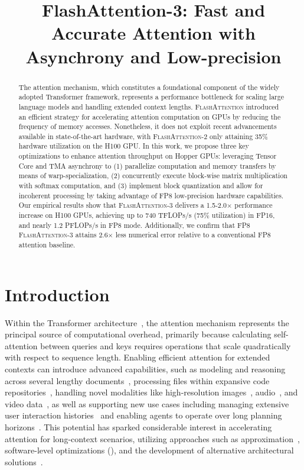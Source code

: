 \title{FlashAttention-3: Fast and Accurate Attention with Asynchrony and Low-precision}

\begin{abstract}
The attention mechanism, which constitutes a foundational component of the widely adopted Transformer framework, represents a performance bottleneck for scaling large language models and handling extended context lengths. \textsc{FlashAttention} introduced an efficient strategy for accelerating attention computation on GPUs by reducing the frequency of memory accesses. Nonetheless, it does not exploit recent advancements available in state-of-the-art hardware, with \textsc{FlashAttention-2} only attaining 35\% hardware utilization on the H100 GPU. In this work, we propose three key optimizations to enhance attention throughput on Hopper GPUs: leveraging Tensor Core and TMA asynchrony to (1) parallelize computation and memory transfers by means of warp-specialization, (2) concurrently execute block-wise matrix multiplication with softmax computation, and (3) implement block quantization and allow for incoherent processing by taking advantage of FP8 low-precision hardware capabilities. Our empirical results show that \textsc{FlashAttention-3} delivers a 1.5-2.0$\times$ performance increase on H100 GPUs, achieving up to 740 TFLOPs/s (75\% utilization) in FP16, and nearly 1.2 PFLOPs/s in FP8 mode. Additionally, we confirm that FP8 \textsc{FlashAttention-3} attains 2.6$\times$ less numerical error relative to a conventional FP8 attention baseline.
\end{abstract}

\section{Introduction}
\label{sec:intro}

Within the Transformer architecture~\citep{vaswani2017attention}, the attention mechanism represents the principal source of computational overhead, primarily because calculating self-attention between queries and keys requires operations that scale quadratically with respect to sequence length. Enabling efficient attention for extended contexts can introduce advanced capabilities, such as modeling and reasoning across several lengthy documents~\citep{guo2021longt5,shaham2022scrolls,peng2023yarn}, processing files within expansive code repositories~\citep{roziere2023code, li2023starcoder}, handling novel modalities like high-resolution images~\citep{chen2022scaling}, audio~\citep{gulati2020conformer}, and video data~\citep{ho2022video}, as well as supporting new use cases including managing extensive user interaction histories~\citep{sun2019bert4rec} and enabling agents to operate over long planning horizons~\citep{yao2022react}. This potential has sparked considerable interest in accelerating attention for long-context scenarios, utilizing approaches such as approximation~\citep{katharopoulos2020transformers,choromanski2020rethinking,tay2020efficient}, software-level optimizations (\citep{rabe2021self,dao2022flashattention,kwon2023efficient}), and the development of alternative architectural solutions~\citep{peng2023rwkv,sun2023retentive,gu2023mamba}.

